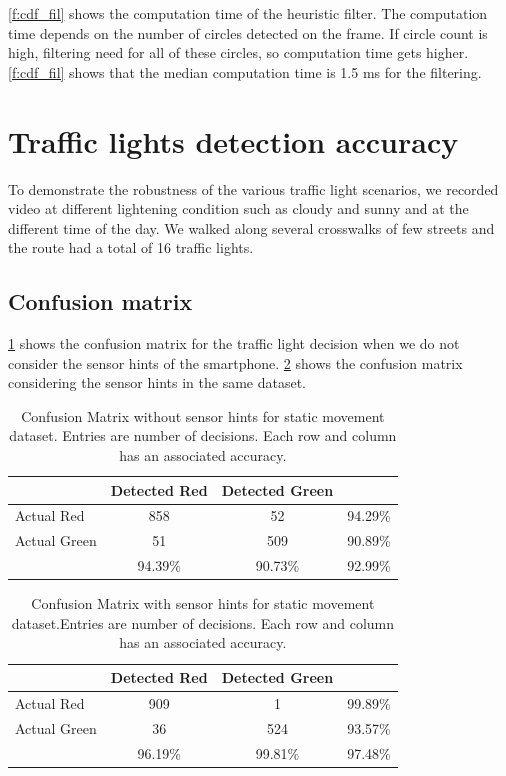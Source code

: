 \ref{f:cdf_fil} shows the computation time of the heuristic filter.
The computation time depends on the number of circles detected on the frame.
If circle count is high, filtering need for all of these circles, so computation time gets higher.
\ref{f:cdf_fil} shows that the median computation time is 1.5 ms for the filtering. 





\section{Traffic lights detection accuracy}
\label{s:acc}
To demonstrate the robustness of the various traffic light scenarios, we recorded video at different lightening condition such as cloudy and sunny and at the different time of the day.
We walked along several crosswalks of few streets and the route had a total of 16 traffic lights.

\subsection{Confusion matrix}
\ref{t:con_nocrp} shows the confusion matrix for the traffic light decision when we do not consider the sensor hints of the smartphone.
\ref{t:con_crp} shows the confusion matrix considering the sensor hints in the same dataset.

\begin{table}[ht!]
  \centering
  \caption{Confusion Matrix without sensor hints for static movement dataset. Entries are number of decisions. Each row and column has an associated accuracy.}
  \label{t:con_nocrp}
  \begin{tabular}{  l | c | c | r }
   
     & Detected Red & Detected Green &  \\
    \hline
    Actual Red & 858 & 52 & 94.29\% \\
    \hline
    Actual Green & 51 & 509 & 90.89\% \\
    \hline
    & 94.39\% & 90.73\% & 92.99\% \\
    
  \end{tabular}
\end{table}

\begin{table}[ht!]
  \centering
  \caption{Confusion Matrix with sensor hints for static movement dataset.Entries are number of decisions. Each row and column has an associated accuracy.}
  \label{t:con_crp}
  \begin{tabular}{  l | c | c | r }
   
     & Detected Red & Detected Green &  \\
    \hline
    Actual Red & 909 & 1 & 99.89\% \\
    \hline
    Actual Green & 36 & 524 & 93.57\% \\
    \hline
    & 96.19\% & 99.81\% & 97.48\% \\
    
  \end{tabular}
\end{table}

